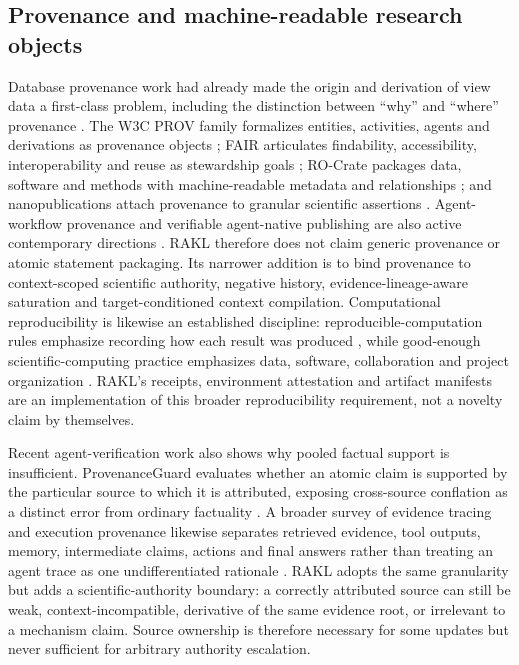 \subsection{Provenance and machine-readable research objects}
Database provenance work had already made the origin and derivation of view data a first-class problem, including the distinction between ``why'' and ``where'' provenance \cite{buneman2001}. The W3C PROV family formalizes entities, activities, agents and derivations as provenance objects \cite{moreau2013}; FAIR articulates findability, accessibility, interoperability and reuse as stewardship goals \cite{wilkinson2016}; RO-Crate packages data, software and methods with machine-readable metadata and relationships \cite{soilandreyes2022}; and nanopublications attach provenance to granular scientific assertions \cite{kuhn2018}. Agent-workflow provenance and verifiable agent-native publishing are also active contemporary directions \cite{souza2025,dogah2026}. RAKL therefore does not claim generic provenance or atomic statement packaging. Its narrower addition is to bind provenance to context-scoped scientific authority, negative history, evidence-lineage-aware saturation and target-conditioned context compilation. Computational reproducibility is likewise an established discipline: reproducible-computation rules emphasize recording how each result was produced \cite{sandve2013}, while good-enough scientific-computing practice emphasizes data, software, collaboration and project organization \cite{wilson2017}. RAKL's receipts, environment attestation and artifact manifests are an implementation of this broader reproducibility requirement, not a novelty claim by themselves.

Recent agent-verification work also shows why pooled factual support is insufficient. ProvenanceGuard evaluates whether an atomic claim is supported by the particular source to which it is attributed, exposing cross-source conflation as a distinct error from ordinary factuality \cite{alvarez2026provenanceguard}. A broader survey of evidence tracing and execution provenance likewise separates retrieved evidence, tool outputs, memory, intermediate claims, actions and final answers rather than treating an agent trace as one undifferentiated rationale \cite{wang2026traces}. RAKL adopts the same granularity but adds a scientific-authority boundary: a correctly attributed source can still be weak, context-incompatible, derivative of the same evidence root, or irrelevant to a mechanism claim. Source ownership is therefore necessary for some updates but never sufficient for arbitrary authority escalation.

